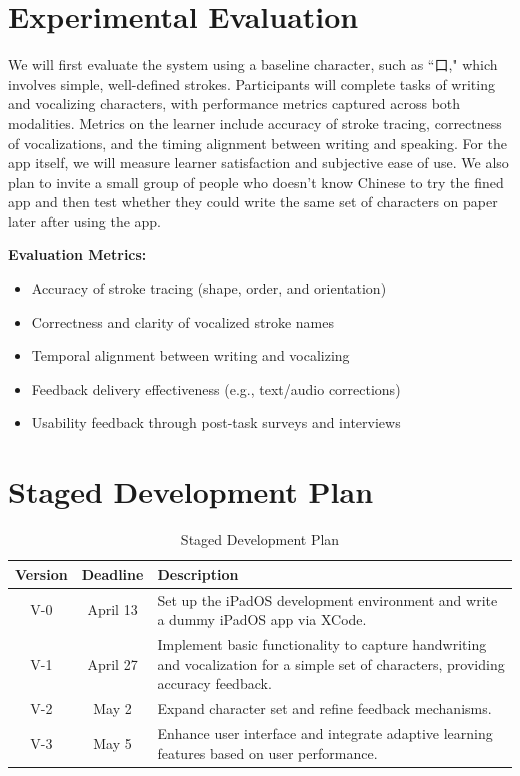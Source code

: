 \documentclass{article}
\begin{document}
\section*{Experimental Evaluation}
We will first evaluate the system using a baseline character, such as ``口," which involves simple, well-defined strokes. Participants will complete tasks of writing and vocalizing characters, with performance metrics captured across both modalities. Metrics on the learner include accuracy of stroke tracing, correctness of vocalizations, and the timing alignment between writing and speaking. For the app itself, we will measure learner satisfaction and subjective ease of use. We also plan to invite a small group of people who doesn't know Chinese to try the fined app and then test whether they could write the same set of characters on paper later after using the app.

\textbf{Evaluation Metrics:}
\begin{itemize}
    \item Accuracy of stroke tracing (shape, order, and orientation)
    \item Correctness and clarity of vocalized stroke names
    \item Temporal alignment between writing and vocalizing
    \item Feedback delivery effectiveness (e.g., text/audio corrections)
    \item Usability feedback through post-task surveys and interviews
\end{itemize}


\section*{Staged Development Plan}

\begin{table}[htbp]
    \centering
    \begin{tabular}{|c|c|p{}|}
        \hline
        \textbf{Version} & \textbf{Deadline} & \textbf{Description} \\
        \hline
        V-0 & April 13 & Set up the iPadOS development environment and write a dummy iPadOS app via XCode. \\
        \hline
        V-1 & April 27 & Implement basic functionality to capture handwriting and vocalization for a simple set of characters, providing accuracy feedback. \\
        \hline
        V-2 & May 2 & Expand character set and refine feedback mechanisms. \\
        \hline
        V-3 & May 5 & Enhance user interface and integrate adaptive learning features based on user performance. \\
        \hline
    \end{tabular}
    \caption{Staged Development Plan}
    \label{tab:dev_plan}
\end{table}
\end{document}
